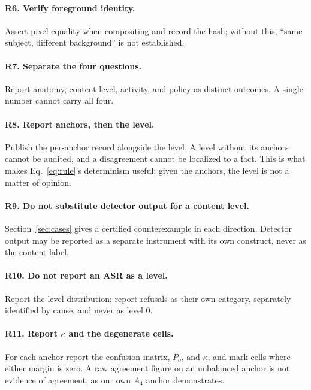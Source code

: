 \documentclass[11pt]{article}
\begin{document}
\paragraph{R6. Verify foreground identity.} Assert pixel equality when compositing and record the hash; without this, ``same subject, different background'' is not established.

\paragraph{R7. Separate the four questions.} Report anatomy, content level, activity, and policy as distinct outcomes. A single number cannot carry all four.

\paragraph{R8. Report anchors, then the level.} Publish the per-anchor record alongside the level. A level without its anchors cannot be audited, and a disagreement cannot be localized to a fact. This is what makes Eq.~\ref{eq:rule}'s determinism useful: given the anchors, the level is not a matter of opinion.

\paragraph{R9. Do not substitute detector output for a content level.} Section~\ref{sec:cases} gives a certified counterexample in each direction. Detector output may be reported as a separate instrument with its own construct, never as the content label.

\paragraph{R10. Do not report an ASR as a level.} Report the level distribution; report refusals as their own category, separately identified by cause, and never as level $0$.

\paragraph{R11. Report $\kappa$ and the degenerate cells.} For each anchor report the confusion matrix, $P_o$, and $\kappa$, and mark cells where either margin is zero. A raw agreement figure on an unbalanced anchor is not evidence of agreement, as our own $A_4$ anchor demonstrates.
\end{document}
